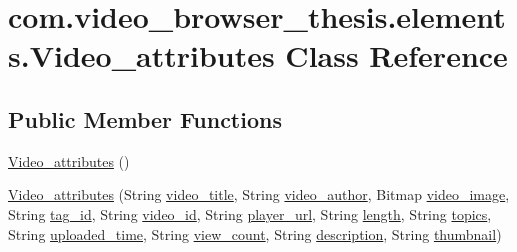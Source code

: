 \hypertarget{classcom_1_1video__browser__thesis_1_1elements_1_1_video__attributes}{\section{com.\-video\-\_\-browser\-\_\-thesis.\-elements.\-Video\-\_\-attributes Class Reference}
\label{classcom_1_1video__browser__thesis_1_1elements_1_1_video__attributes}
}
\subsection*{Public Member Functions}
\begin{DoxyCompactItemize}
\item 
\hyperlink{classcom_1_1video__browser__thesis_1_1elements_1_1_video__attributes_add218c9ce5c0c7b35b29df7bafe62d05}{Video\-\_\-attributes} ()
\item 
\hyperlink{classcom_1_1video__browser__thesis_1_1elements_1_1_video__attributes_a24fa8f859e48b2246a83007f8bf14aed}{Video\-\_\-attributes} (String \hyperlink{classcom_1_1video__browser__thesis_1_1elements_1_1_video__attributes_a90fcc84191f2c525436bdc0cfb1653ea}{video\-\_\-title}, String \hyperlink{classcom_1_1video__browser__thesis_1_1elements_1_1_video__attributes_abd33d1952b8a62347f0f661c3c2ec5ed}{video\-\_\-author}, Bitmap \hyperlink{classcom_1_1video__browser__thesis_1_1elements_1_1_video__attributes_a9a6848418e1b8750117df0f895e90320}{video\-\_\-image}, String \hyperlink{classcom_1_1video__browser__thesis_1_1elements_1_1_video__attributes_a12b1f3d1b5415ac60dddba277c4ddebc}{tag\-\_\-id}, String \hyperlink{classcom_1_1video__browser__thesis_1_1elements_1_1_video__attributes_a7113a6d7df8608b786990974dc8bd269}{video\-\_\-id}, String \hyperlink{classcom_1_1video__browser__thesis_1_1elements_1_1_video__attributes_a52b04c0ee9b91beafc8bb585d7c968b2}{player\-\_\-url}, String \hyperlink{classcom_1_1video__browser__thesis_1_1elements_1_1_video__attributes_aae8458cd610150fe777bcfed6ce6b2e5}{length}, String \hyperlink{classcom_1_1video__browser__thesis_1_1elements_1_1_video__attributes_ae38e2927f054bedae6fd00d5a6d89332}{topics}, String \hyperlink{classcom_1_1video__browser__thesis_1_1elements_1_1_video__attributes_ab249aab820838b9cce924dcf2e684e30}{uploaded\-\_\-time}, String \hyperlink{classcom_1_1video__browser__thesis_1_1elements_1_1_video__attributes_ab32c45e2134b0fbe136713e179ca3bb6}{view\-\_\-count}, String \hyperlink{classcom_1_1video__browser__thesis_1_1elements_1_1_video__attributes_a8fe934f1116f75edb5cc4d9a74d0c33b}{description}, String \hyperlink{classcom_1_1video__browser__thesis_1_1elements_1_1_video__attributes_ae602e9e2f3ec0641635063eeecdef8c0}{thumbnail})
\end{DoxyCompactItemize}
